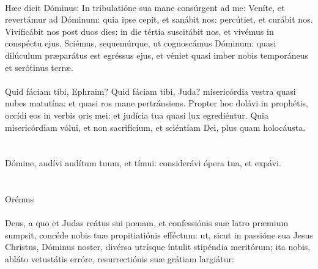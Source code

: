 \documentclass[12pt, a4paper]{article}
\begin{document}
	\\
	Hæc dicit Dóminus: In tribulatióne sua mane consúrgent ad me: Veníte, et revertámur ad Dóminum: quia ipse cepit, et sanábit nos: percútiet, et curábit nos. Vivificábit nos post duos dies: in die tértia suscitábit nos, et vivémus in conspéctu ejus. Sciémus, sequemúrque, ut cognoscámus Dóminum: quasi dilúculum præparátus est egréssus ejus, et véniet quasi imber nobis temporáneus et serótinus terræ.
	\\\\
	Quid fáciam tibi, Ephraim? Quid fáciam tibi, Juda? misericórdia vestra quasi nubes matutína: et quasi ros mane pertránsiens. Propter hoc dolávi in prophétis, occídi eos in verbis oris mei: et judícia tua quasi lux egrediéntur. Quia misericórdiam vólui, et non sacrifícium, et sciéntiam Dei, plus quam holocáusta.
	\\\\
	\\
	Dómine, audívi audítum tuum, et tímui: considerávi ópera tua, et expávi.
	\\
	\\
	\\
	Orémus
	\\
	\\
	Deus, a quo et Judas reátus sui pœnam, et confessiónis suæ latro præmium sumpsit, concéde nobis tuæ propitiatiónis efféctum: ut, sicut in passióne sua Jesus Christus, Dóminus noster, divérsa utrísque íntulit stipéndia meritórum; ita nobis, abláto vetustátis erróre, resurrectiónis suæ grátiam largiátur:
\end{document}
